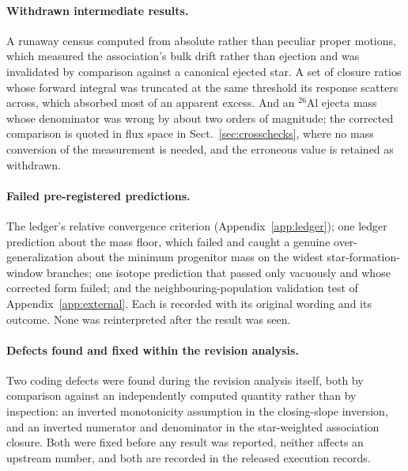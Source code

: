 \documentclass{aa}
\begin{document}
\paragraph{Withdrawn intermediate results.}
A runaway census computed from absolute rather than peculiar proper motions,
which measured the association's bulk drift rather than ejection and was
invalidated by comparison against a canonical ejected star. A set of closure
ratios whose forward integral was truncated at the same threshold its response
scatters across, which absorbed most of an apparent excess. And an $^{26}$Al
ejecta mass whose denominator was wrong by about two orders of magnitude; the
corrected comparison is quoted in flux space in Sect.~\ref{sec:crosschecks},
where no mass conversion of the measurement is needed, and the erroneous value
is retained as withdrawn.

\paragraph{Failed pre-registered predictions.}
The ledger's relative convergence criterion (Appendix~\ref{app:ledger}); one
ledger prediction about the mass floor, which failed and caught a genuine
over-generalization about the minimum progenitor mass on the widest
star-formation-window branches; one isotope prediction that passed only
vacuously and whose corrected form failed; and the neighbouring-population
validation test of
Appendix~\ref{app:external}. Each is recorded with its original wording and its
outcome. None was reinterpreted after the result was seen.

\paragraph{Defects found and fixed within the revision analysis.}
Two coding defects were found during the revision analysis itself, both by
comparison against an independently computed quantity rather than by inspection:
an inverted monotonicity assumption in the closing-slope inversion, and an
inverted numerator and denominator in the star-weighted association closure.
Both were fixed before any result was reported, neither affects an upstream
number, and both are recorded in the released execution records.
\end{document}
